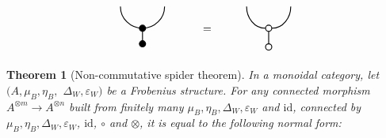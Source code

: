 \documentclass[10pt,a4paper]{amsart}
\newtheorem{theorem}{Theorem}
\newtheorem{scope}{Scope}
\begin{document}
\begin{equation}\label{qubit}
\begin{tikzpicture}[thick]
    \begin{scope}[shift={(0,0)}]
        \draw (0,1.5) to [out=-90,in=180] (0.7,0.8);
        \draw (1.4,1.5) to [out=-90,in=0] (0.7,0.8);
        \node[draw, circle, fill=black, inner sep=2pt] at (0.7,0.8) {};
        \draw (0.7,0.8) -- (0.7,0.3);
        \node[draw, circle, fill=black, inner sep=2pt] at (0.7,0.3) {};
    \end{scope}

    \node at (2.75,0.75) {\large $=$};

    \begin{scope}[shift={(4,0)}]
        \draw (0,1.5) to [out=-90,in=180] (0.6,0.8);
        \draw (1.4,1.5) to [out=-90,in=0] (0.8,0.8);
        \node[draw, circle, fill=white, inner sep=2pt] at (0.7,0.8) {};
        \draw (0.7,0.7) -- (0.7,0.3);
        \node[draw, circle, fill=white, inner sep=2pt] at (0.7,0.2) {};
    \end{scope}
\end{tikzpicture}
\end{equation}

\begin{theorem}[Non-commutative spider theorem]\label{thm2.2}
In a monoidal category, let $(A,  \mu_{B},  \eta_{B},$ $\Delta_{W},  \varepsilon_{W})$ be a Frobenius structure. For any connected morphism $A^{\otimes m} \rightarrow A^{\otimes n}$ built from finitely many $\mu_{B},  \eta_{B},  \Delta_{W},  \varepsilon_{W}$ and $\mathrm{id}$, connected by $\mu_{B},  \eta_{B},  \Delta_{W},  \varepsilon_{W}$, $\mathrm{id}$, $\circ$ and $\otimes$, it is equal to the following normal form:
\begin{center}

\end{center}
\end{theorem}
\end{document}

